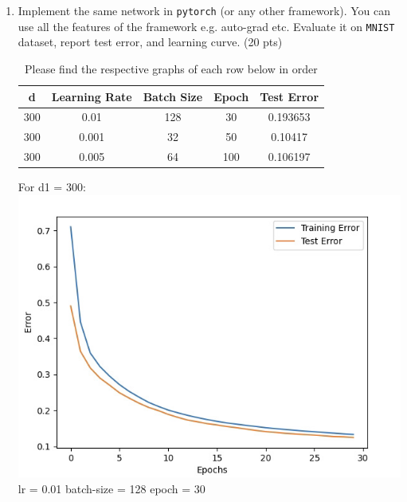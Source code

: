 \documentclass[a4paper]{article}
\theoremstyle{definition}
\newenvironment{soln}{
    \leavevmode\color{blue}\ignorespaces
}{}
\begin{document}
\begin{enumerate}
\begin{soln}
\begin{center}
\end{center}
\end{soln}
    \item  Implement the same network in {\tt pytorch} (or any other framework). You can use all the features of the framework e.g. auto-grad etc. Evaluate it on {\tt MNIST} dataset, report test error, and learning curve. (20 pts) 
    \begin{soln}
    \begin{table}[h!]
\centering
\begin{tabular}{||c c c c c ||} 
 \hline
 d & Learning Rate & Batch Size & Epoch & Test Error \\ [0.5ex] 
 \hline\hline
 300 & 0.01 & 128 & 30 & 0.193653 \\ 
 300 & 0.001 & 32 & 50 & 0.10417 \\
 300 & 0.005 & 64 & 100 & 0.106197 \\[1ex] 
 \hline
\end{tabular}
\caption{Please find the respective graphs of each row below in order}
\label{table:1}
\end{table}
\begin{center}
For d1 = 300: \\
 \includegraphics[scale=0.4]{d=300e=30}\\
 lr = 0.01 batch-size = 128 epoch = 30 \\

\end{center}
\end{soln}
\end{enumerate}
\end{document}
